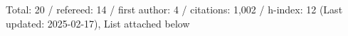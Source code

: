 Total: 20 / refereed: 14 / first author: 4 / citations: 1,002 / h-index: 12 (Last updated: 2025-02-17), List attached below